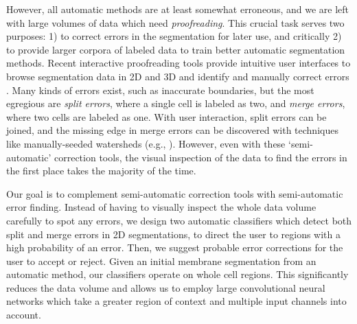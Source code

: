 However, all automatic methods are at least somewhat erroneous, and we are left with large volumes of data which need \emph{proofreading}. This crucial task serves two purposes: 1) to correct errors in the segmentation for later use, and critically 2) to provide larger corpora of labeled data to train better automatic segmentation methods. Recent interactive proofreading tools provide intuitive user interfaces to browse segmentation data in 2D and 3D and identify and manually correct errors \cite{raveler,mojo2,haehn_dojo_2014}. Many kinds of errors exist, such as inaccurate boundaries, but the most egregious are \emph{split errors}, where a single cell is labeled as two, and \emph{merge errors}, where two cells are labeled as one. With user interaction, split errors can be joined, and the missing edge in merge errors can be discovered with techniques like manually-seeded watersheds  (e.g., \cite{haehn_dojo_2014}).  However, even with these `semi-automatic' correction tools, the visual inspection of the data to find the errors in the first place takes the majority of the time.

Our goal is to complement semi-automatic correction tools with semi-automatic error finding. Instead of having to visually inspect the whole data volume carefully to spot any errors, we design two automatic classifiers which detect both split and merge errors in 2D segmentations, to direct the user to regions with a high probability of an error. Then, we suggest probable error corrections for the user to accept or reject. Given an initial membrane segmentation from an automatic method, our classifiers operate on whole cell regions. This significantly reduces the data volume and allows us to employ large convolutional neural networks which take a greater region of context and multiple input channels into account.


